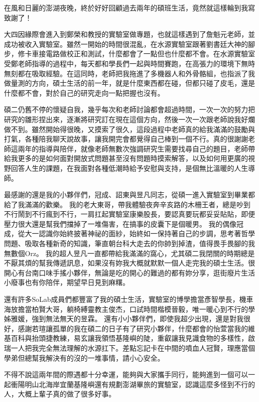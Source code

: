 \begin{acknowledgementsCH}

在風和日麗的澎湖夜晚，終於好好回顧過去兩年的碩班生活，竟然就這樣輪到我寫致謝了！

大四因緣際會進入到鄭榮和教授的實驗室做專題，也就這樣遇到了詹魁元老師，並成功被收入實驗室。雖然一開始的時間很混亂，在水源實驗室跟著劉書廷大神的腳步，修卡車接電路做校正和測試，什麼都會了一點但也什麼都不會。在水源實驗室受鄭老師指導的過程中，每天都和學長們一起與時間賽跑，在高張力的環境下無時無刻都在吸取經驗。在這同時，老師把我拖進了多機器人和外骨骼組，也指派了我做量測的方向，碩士生活的前一年，就是什麼東西都在碰，但都只碰了皮毛，還是什麼都不會，對於自己的研究走向一點把握也沒有。

碩二仍舊不停的懷疑自我，幾乎每次和老師討論都會超過時間，一次一次的努力把研究的雛形捏出來，逐漸將研究訂在現在這個方向，然後一次一次跟老師說我好爛做不到。雖然開始得很晚，又摸索了很久，這段過程中老師真的給我滿滿的鼓勵與打氣，各種陪我聊天說故事，讓我開完會都覺得自己棒到一個不行。真的很謝謝老師這兩年的指導與陪伴，就像老師無數次強調研究生需要找尋自己的題目，老師帶給我更多的是如何面對開放式問題甚至沒有問題時摸索解答，以及如何用更廣的視野回答人生的課題，在我面對各種低潮時給予安慰與支持，是個無比溫暖的人生導師。

最感謝的還是我的小夥伴們，冠成、詔東與昱凡同志，從碩一進入實驗室到畢業都給了我滿滿的歡樂。
我的老大東哥，帶我體驗夜奔辛亥路的木柵王者，總是吵到不行鬧到不行瘋到不行，一肩扛起實驗室康樂股長，要認真要玩都妥妥貼貼，即便壓力很大還是幫我們擋掉了一堆傷害，在搞事的皮囊下是個暖男。
我的偶像冠成，從大一認識你始終披著神祕的面紗，始終如一保持著自己的步調，思考著哲學問題、吸取各種新奇的知識，筆直朝台科大走去的你帥到掉渣，值得畏手畏腳的我無數個Orz。
我的超人昱凡一直都帶給我滿滿的窩心，尤其碩二我閉關的時期總是不厭其煩的幫我傳遞訊息，如果沒有妳我大概就默默一個人走完我的碩士生活。很開心有台南口味手搖小夥伴，無論是吃的開心的難過的都有妳分享，逛街廢片生活小廢事也有你陪伴，期望早日見到麻糬。

還有許多SoLab成員們都豐富了我的碩士生活，實驗室的博學擔當彥智學長，機車海放擔當柏賢大哥，躺椅縛靈教主俊杰，口試時間楷模晉毅，唯一暖心到不行的學姊雅媛，強到無法無天的昱霖。
還有小小夥伴們，即使我超少出現，還是對我很好，感謝若瑄讓孤單的我在碩二的日子有了研究小夥伴，什麼都會的怡萱當我的維基百科與抬頭捷教練，易玄讓我領悟基隆嶼的陡，重叡讓我見識食物的多樣性，啟瑞一人把我完全無法理解的水源扛下。差點忘記卡在中間的噴血人冠賢，理應當個學弟但總幫我解決有的沒的一堆事情，請小心安全。

不得不說這兩年間的際遇都十分幸運，能夠與大家攜手同行，能夠進到一個可以一起衝陽明山北海岸宜蘭基隆嶼還有規劃澎湖畢旅的實驗室，認識這麼多怪到不行的人，大概上輩子真的做了很多好事。


\end{acknowledgementsCH}
